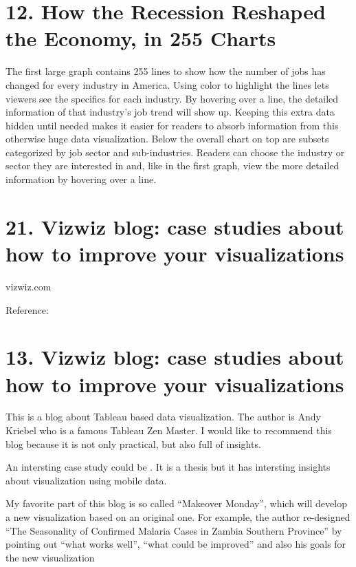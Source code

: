 \documentclass[]{book}
\theoremstyle{definition}
\theoremstyle{definition}
\theoremstyle{definition}
\theoremstyle{remark}
\begin{document}
\citep{recession_economy}

\section{12. How the Recession Reshaped the Economy, in 255
Charts}\label{how-the-recession-reshaped-the-economy-in-255-charts-1}

The first large graph contains 255 lines to show how the number of jobs
has changed for every industry in America. Using color to highlight the
lines lets viewers see the specifics for each industry. By hovering over
a line, the detailed information of that industry's job trend will show
up. Keeping this extra data hidden until needed makes it easier for
readers to absorb information from this otherwise huge data
visualization. Below the overall chart on top are subsets categorized by
job sector and sub-industries. Readers can choose the industry or sector
they are interested in and, like in the first graph, view the more
detailed information by hovering over a line.

\section{21. Vizwiz blog: case studies about how to improve your
visualizations}\label{vizwiz-blog-case-studies-about-how-to-improve-your-visualizations}

vizwiz.com

Reference: \citep{recession_economy}

\section{13. Vizwiz blog: case studies about how to improve your
visualizations}\label{vizwiz-blog-case-studies-about-how-to-improve-your-visualizations-1}

This is a blog about Tableau based data visualization. The author is
Andy Kriebel who is a famous Tableau Zen Master. I would like to
recommend this blog because it is not only practical, but also full of
insights.

An intersting case study could be \citep{case_thesis}. It is a thesis
but it has intersting insights about visualization using mobile data.

My favorite part of this blog is so called ``Makeover Monday'', which
will develop a new visualization based on an original one. For example,
the author re-designed ``The Seasonality of Confirmed Malaria Cases in
Zambia Southern Province'' by pointing out ``what works well'', ``what
could be improved'' and also his goals for the new visualization
\end{document}
